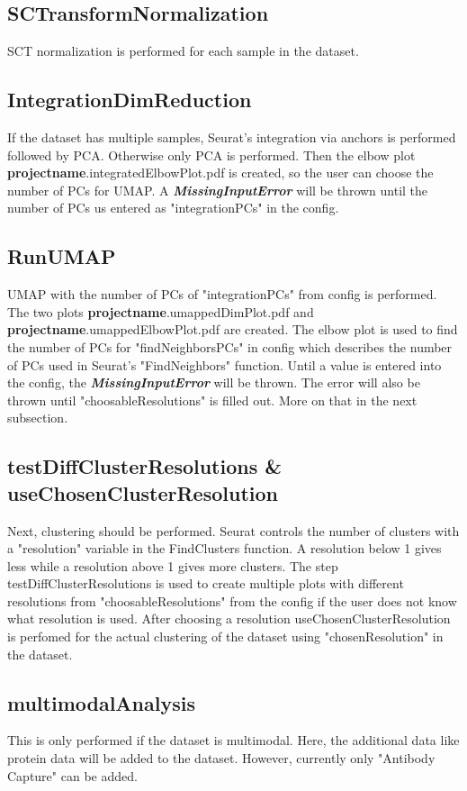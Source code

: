 \subsection{SCTransformNormalization}
SCT normalization is performed for each sample in the dataset.

\subsection{IntegrationDimReduction}
If the dataset has multiple samples, Seurat's integration via anchors is performed followed by PCA. Otherwise only PCA is performed. Then the elbow plot \textbf{projectname}.integratedElbowPlot.pdf is created, so the user can choose the number of PCs for UMAP. A \textbf{\textit{MissingInputError}} will be thrown until the number of PCs us entered as "integrationPCs" in the config.

\subsection{RunUMAP}
UMAP with the number of PCs of "integrationPCs" from config is performed. The two plots \textbf{projectname}.umappedDimPlot.pdf and \textbf{projectname}.umappedElbowPlot.pdf are created. The elbow plot is used to find the number of PCs for "findNeighborsPCs" in config which describes the number of PCs used in Seurat's "FindNeighbors" function. Until a value is entered into the config, the \textbf{\textit{MissingInputError}} will be thrown. The error will also be thrown until "choosableResolutions" is filled out. More on that in the next subsection.

\subsection{testDiffClusterResolutions \& useChosenClusterResolution}
Next, clustering should be performed. Seurat controls the number of clusters with a "resolution" variable in the FindClusters function. A resolution below 1 gives less while a resolution above 1 gives more clusters. The step testDiffClusterResolutions is used to create multiple plots with different resolutions from "choosableResolutions" from the config if the user does not know what resolution is used. After choosing a resolution useChosenClusterResolution is perfomed for the actual clustering of the dataset using "chosenResolution" in the dataset.

\subsection{multimodalAnalysis}
This is only performed if the dataset is multimodal. Here, the additional data like protein data will be added to the dataset. However, currently only "Antibody Capture" can be added.

